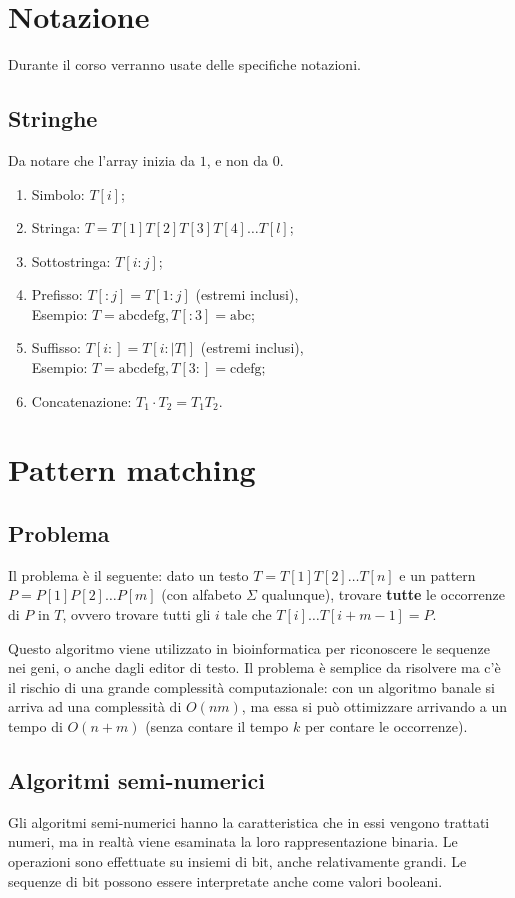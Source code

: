 \section{Notazione}
Durante il corso verranno usate delle specifiche notazioni.
\subsection{Stringhe}
Da notare che l'array inizia da $1$, e non da $0$.
\begin{enumerate}
    \item Simbolo: $T[i]$;
    \item Stringa: $T = T[1]T[2]T[3]T[4] \dots T[l]$;
    \item Sottostringa: $T[i:j]$;
    \item Prefisso: $T[:j] = T[1:j]$ (estremi inclusi),\\
    Esempio: $T = \text{abcdefg}, T[:3] = \text{abc}$;
    \item Suffisso: $T[i:] = T[i:\left|T\right|]$ (estremi inclusi),\\
    Esempio: $T = \text{abcdefg}, T[3:] = \text{cdefg}$;
    \item Concatenazione: $T_1 \cdot T_2 = T_1 T_2$.
\end{enumerate}


\section{Pattern matching}

\subsection{Problema}
Il problema è il seguente: dato un testo $T = T[1]T[2] \dots T[n]$ e un pattern $P = P[1]P[2] \dots P[m]$ (con alfabeto $\Sigma$ qualunque), trovare \textbf{tutte} le occorrenze di $P$ in $T$, ovvero trovare tutti gli $i$ tale che $T[i]\dots T[i + m - 1] = P$. \par
Questo algoritmo viene utilizzato in bioinformatica per riconoscere le sequenze nei geni, o anche dagli editor di testo. Il problema è semplice da risolvere ma c'è il rischio di una grande complessità computazionale: con un algoritmo banale si arriva ad una complessità di $O(nm)$, ma essa si può ottimizzare arrivando a un tempo di $O(n+m)$ (senza contare il tempo $k$ per contare le occorrenze).

\subsection{Algoritmi semi-numerici}
Gli algoritmi semi-numerici hanno la caratteristica che in essi vengono trattati numeri, ma in realtà viene esaminata la loro rappresentazione binaria. Le operazioni sono effettuate su insiemi di bit, anche relativamente grandi. Le sequenze di bit possono essere interpretate anche come valori booleani.

